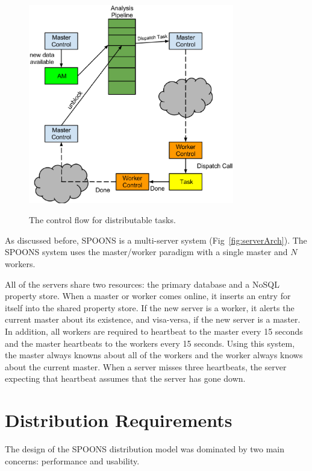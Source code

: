 \documentclass[12pt]{ucthesis}
\newcommand{\captionfonts}{\small\bf\ssp}
\begin{document}
\begin{figure}
   \begin{center}
      \includegraphics[width=0.8\textwidth]{images/SPOONS_Distributable_Task_Control_Flow.eps}
      \captionfonts
      \caption[SPOONS Distributable Task Flow]{The control flow for distributable tasks.}
      \label{fig:taskFlow}
   \end{center}
\end{figure}

As discussed before, SPOONS is a multi-server system (Fig~\ref{fig:serverArch}).
The SPOONS system uses the master/worker paradigm with a single master and $N$ workers.

All of the servers share two resources: the primary database and a NoSQL property store.
When a master or worker comes online, it inserts an entry for itself into the shared property store.
If the new server is a worker, it alerts the current master about its existence, and visa-versa,
if the new server is a master. In addition, all workers are required to heartbeat to the master every
15 seconds and the master heartbeats to the workers every 15 seconds. Using this system, the master
always knowns about all of the workers and the worker always knows about the current master.
When a server misses three heartbeats, the server expecting that heartbeat assumes that the server has
gone down.

\section{Distribution Requirements}
\label{arch-dist-requirements}
The design of the SPOONS distribution model was dominated by two main concerns: performance and usability.
\end{document}
